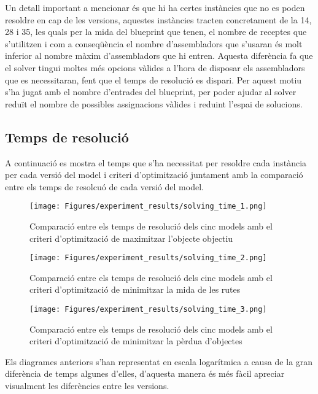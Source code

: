 Un detall important a mencionar és que hi ha certes instàncies que no es poden resoldre en cap de les versions, aquestes instàncies tracten concretament de la 14, 28 i 35, les quals per la mida del blueprint que tenen, el nombre de receptes que s'utilitzen i com a conseqüència el nombre d'assembladors que s'usaran és molt inferior al nombre màxim d'assembladors que hi entren. Aquesta diferència fa que el solver tingui moltes més opcions vàlides a l'hora de disposar els assembladors que es necessitaran, fent que el temps de resolució es dispari. Per aquest motiu s'ha jugat amb el nombre d'entrades del blueprint, per poder ajudar al solver reduït el nombre de possibles assignacions vàlides i reduint l'espai de solucions.

\subsection{Temps de resolució}
A continuació es mostra el temps que s'ha necessitat per resoldre cada instància per cada versió del model i criteri d'optimització juntament amb la comparació entre els temps de resolcuó de cada versió del model.

\begin{figure}[H]
    \centering
    \texttt{[image: Figures/experiment\_results/solving\_time\_1.png]}
    \caption{Comparació entre els temps de resolució dels cinc models amb el criteri d'optimització de maximitzar l'objecte objectiu}
    \label{fig:opt1_times}
\end{figure}

\begin{figure}[H]
    \centering
    \texttt{[image: Figures/experiment\_results/solving\_time\_2.png]}
    \caption{Comparació entre els temps de resolució dels cinc models amb el criteri d'optimització de minimitzar la mida de les rutes}
    \label{fig:opt2_times}
\end{figure}

\begin{figure}[H]
    \centering
    \texttt{[image: Figures/experiment\_results/solving\_time\_3.png]}
    \caption{Comparació entre els temps de resolució dels cinc models amb el criteri d'optimització de minimitzar la pèrdua d'objectes}
    \label{fig:opt3_times}
\end{figure}

Els diagrames anteriors s'han representat en escala logarítmica a causa de la gran diferència de temps algunes d'elles, d'aquesta manera és més fàcil apreciar visualment les diferències entre les versions.\\

